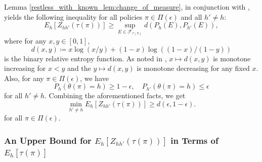 Lemma \ref{restless_with_known_lem:change_of_measure}, in conjunction with \cite[Lemma 19]{Kaufmann2016}, yields the following inequality for all policies $\pi\in \Pi(\epsilon)$ and all $h'\neq h$:
\begin{equation}
	E_h[Z_{hh'}(\tau(\pi))]\geq \sup\limits_{E\in\mathcal{F}_{\tau(\pi)}} d(P_h(E),P_{h'}(E)),\label{restless_with_known_eq:Kaufmann_DPI_bound}
\end{equation} 
where for any $x,y\in [0,1]$, $$d(x,y)\coloneqq x\log (x/y)+(1-x)\log ((1-x)/(1-y))$$ is the binary relative entropy function. As noted in \cite{Kaufmann2016}, $x\mapsto d(x,y)$ is monotone increasing for $x<y$ and the $y\mapsto d(x,y)$ is monotone decreasing for any fixed $x$. Also, for any $\pi\in\Pi(\epsilon)$, we have $$P_h(\theta(\pi)=h)\geq 1-\epsilon,\quad P_{h'}(\theta(\pi)=h)\leq \epsilon$$ for all $h'\neq h$. Combining the aforementioned facts, we get
\begin{equation}
	\min\limits_{h'\neq h} E_h[Z_{hh'}(\tau(\pi))]\geq d(\epsilon,1-\epsilon).\label{restless_with_known_eq:Kaufmann_DPI_bound_epsilon}
\end{equation}
for all $\pi\in\Pi(\epsilon)$.

\subsubsection{An Upper Bound for  $E_h[Z_{hh'}(\tau(\pi))]$ in Terms of $ E_h[\tau(\pi)]$}

